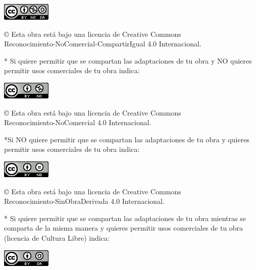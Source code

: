 \documentclass[12pt,a4paper,oneside]{report}
\begin{document}
\begin{center}
\includegraphics[scale=1.8]{images/by-nc-sa_88x31}\\[5mm]
\end{center}


© Esta obra está bajo una licencia de Creative Commons \\
Reconocimiento-NoComercial-CompartirIgual 4.0 Internacional.

\bigskip
\bigskip
\bigskip
* Si quiere permitir que se compartan las adaptaciones de tu obra y NO quieres permitir usos comerciales de tu obra indica:

\begin{center}
\includegraphics[scale=1.8]{images/by-nc_88x31}\\[5mm]
\end{center}


© Esta obra está bajo una licencia de Creative Commons \\
Reconocimiento-NoComercial 4.0 Internacional.


\newpage
\thispagestyle{empty}

\bigskip
*Si NO quiere permitir que se compartan las adaptaciones de tu obra y quieres permitir usos comerciales de tu obra indica:

\begin{center}
\includegraphics[scale=1.8]{images/by-nd_88x31}\\[5mm]
\end{center}

© Esta obra está bajo una licencia de Creative Commons \\
Reconocimiento-SinObraDerivada 4.0 Internacional.

\bigskip
\bigskip
\bigskip
* Si quiere permitir que se compartan las adaptaciones de tu obra mientras se comparta de la misma manera y quieres permitir usos comerciales de tu obra (licencia de Cultura Libre) indica:

\begin{center}
\includegraphics[scale=1.8]{images/by-sa_88x31}\\[5mm]
\end{center}
\end{document}
